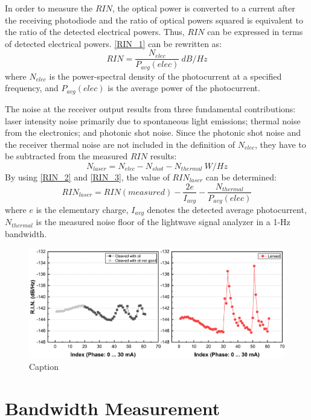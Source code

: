 In order to measure the $RIN$, the optical power is converted to a current after the receiving photodiode and the ratio of optical powers squared is equivalent to the ratio of the detected electrical powers. Thus, $RIN$ can be expressed in terms of detected electrical powers. \autoref{RIN_1} can be rewritten as:
\begin{equation}
    RIN=\frac{N_{elec}}{P_{avg}(elec)} \ dB/Hz
    \label{RIN_2}
\end{equation}
where $N_{elec}$ is the power-spectral density of the photocurrent at a specified frequency, and $P_{avg}(elec)$ is the average power of the photocurrent.

The noise at the receiver output results from three fundamental contributions: laser intensity noise primarily due to spontaneous light emissions; thermal noise from the electronics; and photonic shot noise. Since the photonic shot noise and the receiver thermal noise are not included in the definition of $N_{elec}$, they have to be subtracted from the measured $RIN$ results:
\begin{equation}
    N_{laser}=N_{elec}-N_{shot}-N_{thermal} \ W/Hz
    \label{RIN_3}
\end{equation}
By using \autoref{RIN_2} and \autoref{RIN_3}, the value of $RIN_{laser}$ can be determined:
\begin{equation}
    RIN_{laser}=RIN(measured)-\frac{2e}{I_{avg}}-\frac{N_{thermal}}{P_{avg}(elec)}
\end{equation}
where $e$ is the elementary charge, $I_{avg}$ denotes the detected average photocurrent, $N_{thermal}$ is the measured noise floor of the lightwave signal analyzer in a 1-Hz bandwidth.
\begin{figure}[ht]
    \centering
    \includegraphics[width=\linewidth]{figures/RIN_cleaved_and_lensed.png}
    \caption{Caption}
    \label{fig:RIN_cleaved_and_lensed}
\end{figure}

\section{Bandwidth Measurement}\label{sec:bandwidth_measurement}
